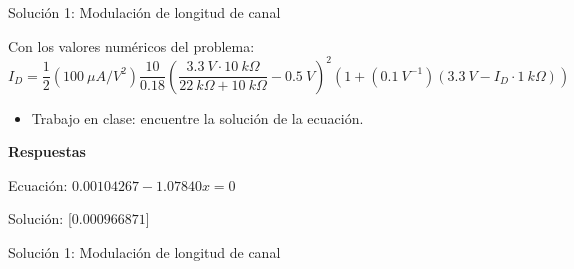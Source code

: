 \documentclass[t,10pt,aspectratio=169]{beamer}
\begin{document}
\begin{frame}{Solución 1: Modulación de longitud de canal}

Con los valores numéricos del problema:
\[ I_D = \dfrac{1}{2} (100\ \mu A/V^2) \dfrac{10}{0.18} \left( \dfrac{3.3\ V \cdot 10\ k\Omega}{22\ k\Omega + 10\ k\Omega} - 0.5\ V \right)^2 \left(1 + (0.1\ V^{-1}) (3.3\ V - I_D \cdot 1\ k\Omega) \right) \]

\begin{itemize}
    \item Trabajo en clase: encuentre la solución de la ecuación.
\end{itemize}


\vspace{5mm}
\textbf{Respuestas}

Ecuación: $0.00104267 - 1.07840x = 0$

Solución: [$0.000966871$]

\end{frame}


\begin{frame}{Solución 1: Modulación de longitud de canal}

\end{frame}
\end{document}
